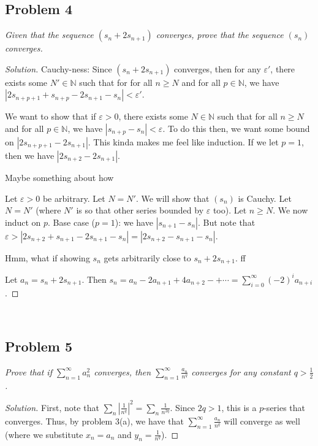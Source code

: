 \documentclass{article}
\newcommand{\N}{{\mathbb N}}
\newcommand{\ep}{{\varepsilon}}
\begin{document}
\subsection*{Problem 4}
{\it Given that the sequence $(s_n + 2s_{n+1})$ converges,
prove that the sequence $(s_n)$ converges.}
\begin{proof}[Solution]\let\qed\relax
	Cauchy-ness:
	Since $(s_n + 2s_{n+1})$ converges,
	then for any $\ep'$, there exists some $N' \in \N$
	such that for for all $n \geq N$ and for all $p \in \N$,
	we have $|2s_{n+p+1} + s_{n+p} - 2s_{n+1} - s_n| < \ep'$.

	We want to show that if $\ep > 0$,
	there exists some $N \in \N$ such that
	for all $n \geq N$ and for all $p \in \N$,
	we have $|s_{n+p} - s_n| < \ep$.
	To do this then, we want some bound on $|2s_{n+p+1} - 2s_{n+1}|$.
	This kinda makes me feel like induction.
	If we let $p = 1$, then we have $|2s_{n+2} - 2s_{n+1}|$.

	Maybe something about how 

	Let $\ep > 0$ be arbitrary.
	Let $N = N'$.
	We will show that $(s_n)$ is Cauchy.
	Let $N = N'$ (where $N'$ is so that other series bounded by $\ep$ too).
	Let $n \geq N$. We now induct on $p$.
	Base case ($p = 1$):
	we have $|s_{n+1} - s_n|$.
	But note that $\ep > |2s_{n+2} + s_{n+1} - 2s_{n+1} - s_n|
	= |2s_{n+2} - s_{n+1} - s_n|$.

	Hmm, what if showing $s_n$ gets arbitrarily close to $s_n + 2s_{n+1}$.
	ff

	Let $a_n = s_n + 2s_{n+1}$.
	Then $s_n = a_n - 2a_{n+1} + 4a_{n+2} - + \cdots =
	\sum_{i=0}^\infty (-2)^ia_{n+i}$.
\end{proof}
\clearpage
~\clearpage

\subsection*{Problem 5}
{\it Prove that if $\sum^\infty_{n=1}a^2_n$ converges,
then $\sum_{n=1}^\infty \frac{a_n}{n^q}$
converges for any constant $q > \frac{1}{2}$.}

\begin{proof}[Solution]\let\qed\relax
	First, note that $\sum_{n}|\frac{1}{n^q}|^2 = \sum_n \frac{1}{n^{2q}}$.
	Since $2q > 1$, this is a $p$-series that converges.
	Thus, by problem 3(a), we have that
	$\sum_{n=1}^\infty \frac{a_n}{n^q}$ will converge as well
	(where  we substitute $x_n = a_n$ and $y_n = \frac{1}{n^q}$).
\end{proof} 
\clearpage
~\clearpage
\end{document}
